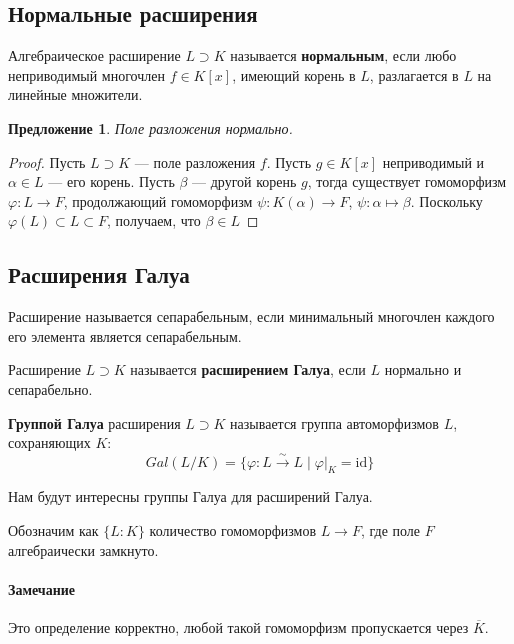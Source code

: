 \documentclass[a4paper]{article}
\let\temp\phi
\let\phi\varphi
\let\varphi\temp
\newcommand{\id}{\mathrm{id}}
\numberwithin{theorem}{section}
\numberwithin{lemma}{section}
\newtheorem{proposition}{Предложение}
\numberwithin{proposition}{section}
\numberwithin{corollary}{section}
\begin{document}

\subsection*{Нормальные расширения}

Алгебраическое расширение $L \supset K$ называется \textbf{нормальным},
если любо неприводимый многочлен $f \in K[x]$, имеющий корень в $L$,
разлагается в $L$ на линейные множители.

\begin{proposition}
Поле разложения нормально.
\end{proposition}
\begin{proof}
Пусть $L \supset K$ --- поле разложения $f$.
Пусть $g \in K[x]$ неприводимый и $\alpha \in L$ --- его корень.
Пусть $\beta$ --- другой корень $g$, тогда существует
гомоморфизм $\phi: L \to F$, продолжающий
гомоморфизм $\psi: K(\alpha) \to F$, $\psi: \alpha \mapsto \beta$.
Поскольку $\phi(L) \subset L \subset F$, получаем, что $\beta \in L$
\end{proof}

\subsection*{Расширения Галуа}

Расширение называется сепарабельным,
если минимальный многочлен каждого его элемента является сепарабельным.

Расширение $L \supset K$ называется \textbf{расширением Галуа},
если $L$ нормально и сепарабельно.

\textbf{Группой Галуа} расширения $L \supset K$ называется
группа автоморфизмов $L$, сохраняющих $K$:
\[Gal(L/K) = \{\phi: L \xrightarrow{\sim} L \mid \phi|_K = \id \}\]

Нам будут интересны группы Галуа для расширений Галуа.

Обозначим как $\{L:K\}$ количество гомоморфизмов $L \to F$,
где поле $F$ алгебраически замкнуто.

\paragraph*{Замечание} Это определение корректно,
любой такой гомоморфизм пропускается через $\overline{K}$.
\end{document}
